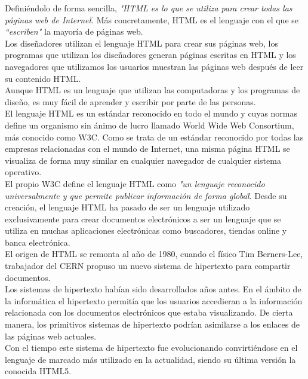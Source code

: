 Defini\'endolo de forma sencilla, \textsl{"HTML es lo que se utiliza para crear todas las p\'aginas web de Internet\"}. M\'as concretamente, HTML es el lenguaje con el que se \textsl{``escriben"} la mayor\'ia de p\'aginas web.\\

Los dise\~nadores utilizan el lenguaje HTML para crear sus p\'aginas web, los programas que utilizan los dise\~nadores generan p\'aginas escritas en HTML y los navegadores que utilizamos los usuarios muestran las p\'aginas web despu\'es de leer su contenido HTML.\\

Aunque HTML es un lenguaje que utilizan las computadoras y los programas de dise\~no, es muy f\'acil de aprender y escribir por parte de las personas.\\

El lenguaje HTML es un est\'andar reconocido en todo el mundo y cuyas normas define un organismo sin \'animo de lucro llamado World Wide Web Consortium, m\'as conocido como W3C. Como se trata de un est\'andar reconocido por todas las empresas relacionadas con el mundo de Internet, una misma p\'agina HTML se visualiza de forma muy similar en cualquier navegador de cualquier sistema operativo.\\

El propio W3C define el lenguaje HTML como \textsl{"un lenguaje reconocido universalmente y que permite publicar informaci\'on de forma global\"}. Desde su creaci\'on, el lenguaje HTML ha pasado de ser un lenguaje utilizado exclusivamente para crear documentos electr\'onicos a ser un lenguaje que se utiliza en muchas aplicaciones electr\'onicas como buscadores, tiendas online y banca electr\'onica.\\

El origen de HTML se remonta al a\~no de 1980, cuando el f\'isico Tim Berners-Lee, trabajador del CERN propuso un nuevo sistema de hipertexto para compartir documentos.\\

Los sistemas de hipertexto hab\'ian sido desarrollados a\~nos antes. En el \'ambito de la inform\'atica el hipertexto permit\'ia que los usuarios accedieran a la informaci\'on relacionada con los documentos electr\'onicos que estaba visualizando. De cierta manera, los primitivos sistemas de hipertexto podr\'ian asimilarse a los enlaces de las p\'aginas web actuales.\\

Con el tiempo este sistema de hipertexto fue evolucionando convirti\'endose en el lenguaje de marcado m\'as utilizado en la actualidad, siendo su \'ultima versi\'on la conocida HTML5.\\

